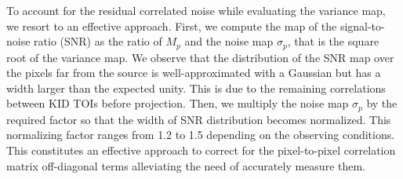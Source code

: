 
{\lp To account for the residual
correlated noise while evaluating the variance map, we resort to an
effective approach.
First, we compute the map of the signal-to-noise ratio (SNR) as the ratio of
$M_p$ and the noise map $\sigma_p$, that is the square root of the
variance map. We observe that the distribution of the SNR map over the pixels far from the source is
well-approximated with a Gaussian but has a width larger than the
expected unity. This is due to the remaining correlations between KID TOIs
before projection. Then, we multiply the noise map 
$\sigma_p$ by the required factor so
that the width of SNR distribution becomes normalized.
This normalizing factor ranges from 1.2 to 1.5 depending on the observing conditions. This
constitutes an effective approach to correct for the pixel-to-pixel
correlation matrix off-diagonal terms alleviating the need of
accurately measure them.}

%
%

